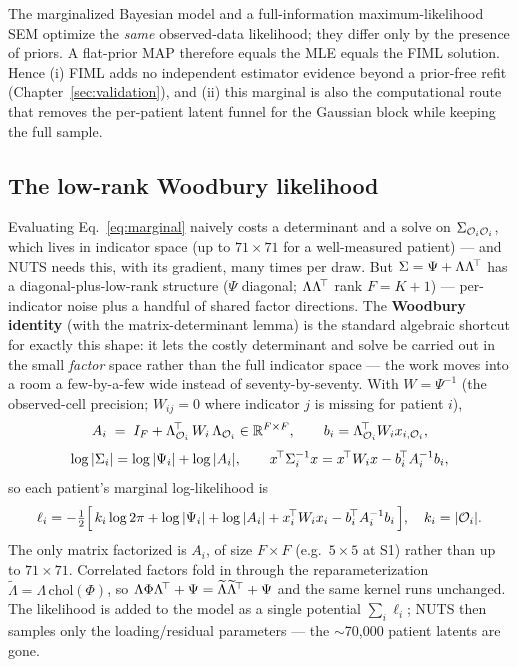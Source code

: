 \begin{methodsbox}
The marginalized Bayesian model and a full-information maximum-likelihood SEM optimize the \emph{same}
observed-data likelihood; they differ only by the presence of priors. A flat-prior MAP therefore equals the
MLE equals the FIML solution. Hence (i) FIML adds no independent estimator evidence beyond a prior-free refit
(Chapter~\ref{sec:validation}), and (ii) this marginal is also the computational route that removes the
per-patient latent funnel for the Gaussian block while keeping the full sample.
\end{methodsbox}

\subsection{The low-rank Woodbury likelihood}
Evaluating Eq.~\eqref{eq:marginal} naively costs a determinant and a solve on $\Sigma_{\mathcal{O}_i\mathcal{O}_i}$, which
lives in indicator space (up to $71\times 71$ for a well-measured patient) --- and NUTS needs this, with its
gradient, many times per draw. But $\Sigma=\Psi+\Lambda\Lambda^{\!\top}$ has a diagonal-plus-low-rank structure
($\Psi$ diagonal; $\Lambda\Lambda^{\!\top}$ rank $F=K{+}1$) --- per-indicator noise plus a handful of shared factor
directions. The \textbf{Woodbury identity} (with the matrix-determinant lemma) is the standard algebraic
shortcut for exactly this shape: it lets the costly determinant and solve be carried out in the small
\emph{factor} space rather than the full indicator space --- the work moves into a room a few-by-a-few wide
instead of seventy-by-seventy. With $W=\Psi^{-1}$ (the observed-cell precision; $W_{ij}=0$
where indicator $j$ is missing for patient $i$),
\begin{equation}
A_i \;=\; I_F + \Lambda_{\mathcal{O}_i}^{\!\top}\,W_i\,\Lambda_{\mathcal{O}_i}\in\mathbb{R}^{F\times F},
\qquad b_i=\Lambda_{\mathcal{O}_i}^{\!\top} W_i x_{i,\mathcal{O}_i},
\end{equation}
\begin{equation}
\log|\Sigma_i| = \log|\Psi_i| + \log|A_i|,
\qquad
x^{\!\top}\Sigma_i^{-1}x = x^{\!\top} W_i x - b_i^{\!\top} A_i^{-1} b_i,
\end{equation}
so each patient's marginal log-likelihood is
\begin{equation}
\label{eq:woodbury}
\ell_i = -\tfrac{1}{2}\Big[\, k_i\log 2\pi + \log|\Psi_i| + \log|A_i| + x_i^{\!\top} W_i x_i - b_i^{\!\top} A_i^{-1} b_i \,\Big],
\quad k_i=|\mathcal{O}_i| .
\end{equation}
The only matrix factorized is $A_i$, of size $F\times F$ (e.g.\ $5\times 5$ at S1) rather than up to
$71\times 71$. Correlated factors fold in through the reparameterization $\widetilde\Lambda=\Lambda\,\mathrm{chol}(\Phi)$,
so $\Lambda\Phi\Lambda^{\!\top}+\Psi=\widetilde\Lambda\widetilde\Lambda^{\!\top}+\Psi$ and the same kernel runs unchanged.
The likelihood is added to the model as a single potential $\sum_i\ell_i$; NUTS then samples only the
loading/residual parameters --- the $\sim$70{,}000 patient latents are gone.

